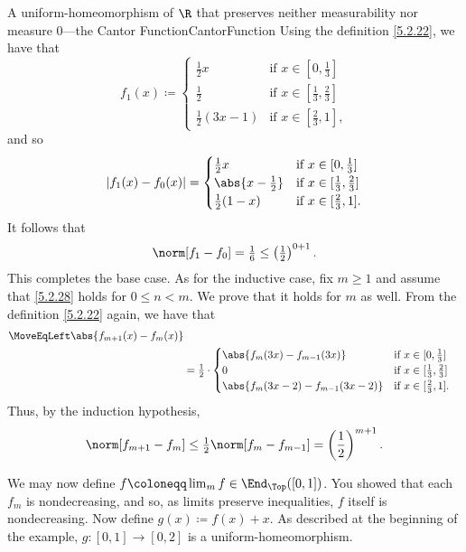\begin{exm}{A uniform-homeomorphism of $\R$ that preserves neither measurability nor measure $0$---the Cantor Function}{CantorFunction}
Using the definition \eqref{5.2.22}, we have that
\begin{equation}
f_1(x)\coloneqq \begin{cases}\tfrac{1}{2}x & \text{if }x\in [0,\tfrac{1}{3}] \\ \tfrac{1}{2} & \text{if }x\in [\tfrac{1}{3},\tfrac{2}{3}] \\ \tfrac{1}{2}(3x-1) & \text{if }x\in [\tfrac{2}{3},1],\end{cases}
\end{equation}
and so
\begin{equation}
\left| f_1(x)-f_0(x)\right| =\begin{cases}\tfrac{1}{2}x & \text{if }x\in [0,\tfrac{1}{3}] \\ \abs{x-\tfrac{1}{2}} & \text{if }x\in [\tfrac{1}{3},\tfrac{2}{3}] \\ \tfrac{1}{2}(1-x) & \text{if }x\in [\tfrac{2}{3},1].\end{cases}
\end{equation}
It follows that
\begin{equation}
\norm[f_1-f_0]=\tfrac{1}{6}\leq \left( \tfrac{1}{2}\right) ^{0+1}.
\end{equation}
This completes the base case.  As for the inductive case, fix $m\geq 1$ and assume that \eqref{5.2.28} holds for $0\leq n<m$.  We prove that it holds for $m$ as well.  From the definition \eqref{5.2.22} again, we have that
{\small
\begin{equation}
\begin{split}
\MoveEqLeft
\abs{f_{m+1}(x)-f_m(x)} \\
& =\tfrac{1}{2}\cdot \begin{cases}\abs{f_m(3x)-f_{m-1}(3x)} & \text{if }x\in [0,\tfrac{1}{3}] \\ 0 & \text{if }x\in [\tfrac{1}{3},\tfrac{2}{3}] \\ \abs{f_m(3x-2)-f_{m-1}(3x-2)} & \text{if }x\in [\tfrac{2}{3},1].\end{cases}
\end{split}
\end{equation}
}
Thus, by the induction hypothesis,
\begin{equation}
\norm[f_{m+1}-f_m]\leq \tfrac{1}{2}\norm[f_m-f_{m-1}]=\left( \frac{1}{2}\right) ^{m+1}.
\end{equation}

We may now define $f\coloneqq \lim _mf\in \End _{\Top}([0,1])$.  You showed that each $f_m$ is nondecreasing, and so, as limits preserve inequalities, $f$ itself is nondecreasing.  Now define $g(x)\coloneqq f(x)+x$.  As described at the beginning of the example, $g\colon [0,1]\rightarrow [0,2]$ is a uniform-homeomorphism.


\end{exm}
